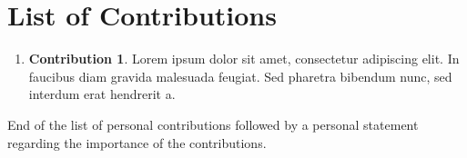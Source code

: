 

\chapter*{List of Contributions} %
\label{chap:Articles}

\begin{enumerate}
	\item \textbf{Contribution 1}. Lorem ipsum dolor sit amet, consectetur adipiscing elit. In faucibus diam gravida malesuada feugiat. Sed pharetra bibendum nunc, sed interdum erat hendrerit a.
\end{enumerate}

\noindent End of the list of personal contributions followed by a personal statement regarding the importance of the contributions.

\cleardoublepage
